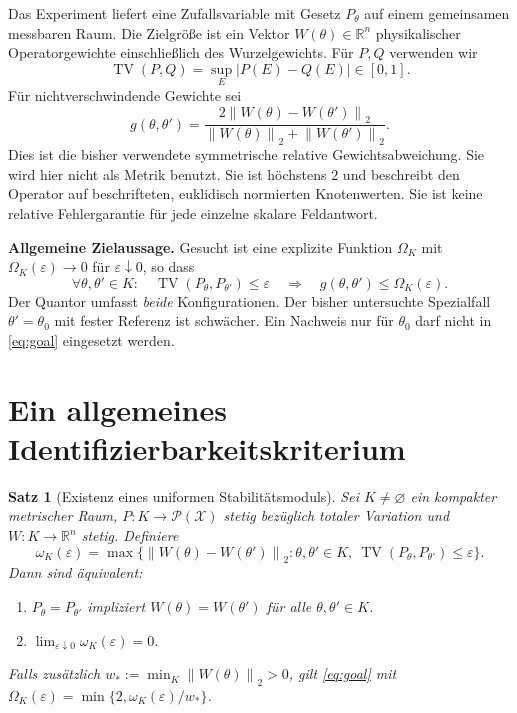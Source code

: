 \documentclass[11pt,a4paper]{article}
\newtheorem{theorem}{Satz}
\theoremstyle{definition}\newtheorem{definition}{Definition}
\theoremstyle{remark}\newtheorem*{remark}{Bemerkung}
\newcommand{\TV}{\operatorname{TV}}
\newcommand{\R}{\mathbb{R}}
\newcommand{\norm}[1]{\left\lVert#1\right\rVert}
\newcommand{\abs}[1]{\left|#1\right|}
\begin{document}
Das Experiment liefert eine Zufallsvariable mit Gesetz $P_\theta$ auf einem gemeinsamen messbaren Raum. Die Zielgröße ist ein Vektor $W(\theta)\in\R^n$ physikalischer Operatorgewichte einschließlich des Wurzelgewichts. Für $P,Q$ verwenden wir
\begin{equation}
 \TV(P,Q)=\sup_E\abs{P(E)-Q(E)}\in[0,1].
\end{equation}
Für nichtverschwindende Gewichte sei
\begin{equation}\label{eq:gap}
 g(\theta,\theta')=
 \frac{2\norm{W(\theta)-W(\theta')}_2}
 {\norm{W(\theta)}_2+\norm{W(\theta')}_2}.
\end{equation}
Dies ist die bisher verwendete symmetrische relative Gewichtsabweichung. Sie wird hier nicht als Metrik benutzt. Sie ist höchstens $2$ und beschreibt den Operator auf beschrifteten, euklidisch normierten Knotenwerten. Sie ist keine relative Fehlergarantie für jede einzelne skalare Feldantwort.

\textbf{Allgemeine Zielaussage.} Gesucht ist eine explizite Funktion $\Omega_K$ mit $\Omega_K(\varepsilon)\to0$ für $\varepsilon\downarrow0$, so dass
\begin{equation}\label{eq:goal}
 \forall\theta,\theta'\in K:\quad
 \TV(P_\theta,P_{\theta'})\leq\varepsilon
 \quad\Longrightarrow\quad
 g(\theta,\theta')\leq\Omega_K(\varepsilon).
\end{equation}
Der Quantor umfasst \emph{beide} Konfigurationen. Der bisher untersuchte Spezialfall $\theta'=\theta_0$ mit fester Referenz ist schwächer. Ein Nachweis nur für $\theta_0$ darf nicht in \eqref{eq:goal} eingesetzt werden.

\section{Ein allgemeines Identifizierbarkeitskriterium}

\begin{theorem}[Existenz eines uniformen Stabilitätsmoduls]\label{thm:compact}
Sei $K\ne\varnothing$ ein kompakter metrischer Raum, $P:K\to\mathcal P(\mathcal X)$ stetig bezüglich totaler Variation und $W:K\to\R^n$ stetig. Definiere
\begin{equation}\label{eq:omega}
 \omega_K(\varepsilon)=
 \max\{\norm{W(\theta)-W(\theta')}_2:
       \theta,\theta'\in K,\ \TV(P_\theta,P_{\theta'})\leq\varepsilon\}.
\end{equation}
Dann sind äquivalent:
\begin{enumerate}[label=(\roman*)]
 \item $P_\theta=P_{\theta'}$ impliziert $W(\theta)=W(\theta')$ für alle $\theta,\theta'\in K$.
 \item $\lim_{\varepsilon\downarrow0}\omega_K(\varepsilon)=0$.
\end{enumerate}
Falls zusätzlich $w_*:=\min_K\norm{W(\theta)}_2>0$, gilt \eqref{eq:goal} mit
$\Omega_K(\varepsilon)=\min\{2,\omega_K(\varepsilon)/w_*\}$.
\end{theorem}
\end{document}
